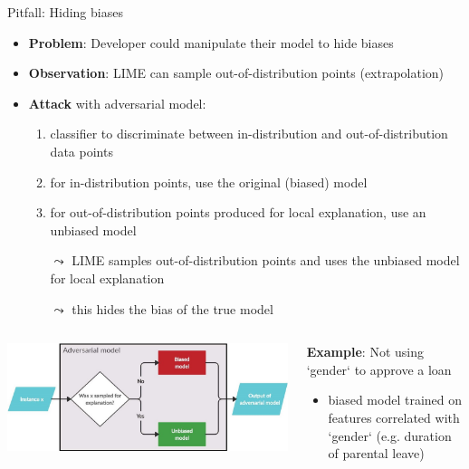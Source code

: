 \documentclass[11pt,compress,t,notes=noshow, aspectratio=169, xcolor=table]{beamer}
\begin{document}
\begin{frame}{Pitfall: Hiding biases }

\begin{itemize}
	\item \textbf{Problem}: Developer could manipulate their model to hide biases 
	\item \textbf{Observation}: LIME can sample out-of-distribution points (extrapolation)
	\pause
	\item \textbf{Attack} with adversarial model:
	    \begin{enumerate}
	    \item classifier to discriminate between in-distribution and out-of-distribution data points
	    \item for in-distribution points, use the original (biased) model
	    \item for out-of-distribution points produced for local explanation, use an unbiased model
	    \item[$\leadsto$] LIME samples out-of-distribution points and uses the unbiased model for local explanation\\
	    \item[$\leadsto$] this hides the bias of the true model
	    \end{enumerate}
\end{itemize}
	\begin{columns}[T, totalwidth=\linewidth]
		\begin{column}{0.5\textwidth}
	    \centering
	    \includegraphics[width=\textwidth]{figure/attack_biased_unbiased.jpg}
	    \end{column}
\pause
	    \begin{column}{0.5\textwidth}
	    \textbf{Example}: Not using `gender` to approve a loan %
	    \begin{itemize}
	        \item biased model trained on features correlated with `gender` (e.g. duration of parental leave)\\

\end{itemize}
\end{column}
\end{columns}
\end{frame}
\end{document}
